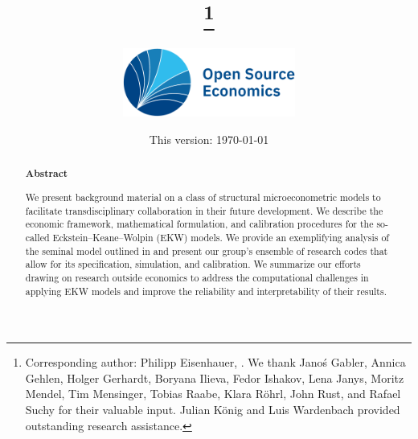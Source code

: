 
\begin{titlepage}

\title{%
	\sffamily\bfseries%
	\papertitle%
	\thanks{Corresponding author: Philipp Eisenhauer, . We thank Jano\'s Gabler, Annica Gehlen, Holger Gerhardt, Boryana Ilieva, Fedor Ishakov, Lena Janys, Moritz Mendel, Tim Mensinger, Tobias Raabe, Klara R\"ohrl, John Rust, and Rafael Suchy for their valuable input. Julian König and Luis Wardenbach provided outstanding research assistance.}
}

\author{%
	\bigskip%
	\includegraphics[height=2.25cm]{../material/OSE_logo_RGB.pdf}%
	\bigskip%
}

\date{%
	\normalsize%
	This version: \today%
}


\maketitle

\begin{abstract}
\begin{center}\textsf{\textbf{Abstract}}\end{center}\medskip
\noindent We present background material on a class of structural microeconometric models to facilitate transdisciplinary collaboration in their future development. We describe the economic framework, mathematical formulation, and calibration procedures for the so-called Eckstein--Keane--Wolpin (EKW) models. We provide an exemplifying analysis of the seminal model outlined in \citet{Keane.1997} and present our group's ensemble of research codes that allow for its specification, simulation, and calibration. We summarize our efforts drawing on research outside economics to
address the computational challenges in applying EKW models and improve the reliability and interpretability of their results.
\end{abstract}


\thispagestyle{empty}

\end{titlepage}

\setcounter{page}{2}

\tableofcontents

\clearpage
